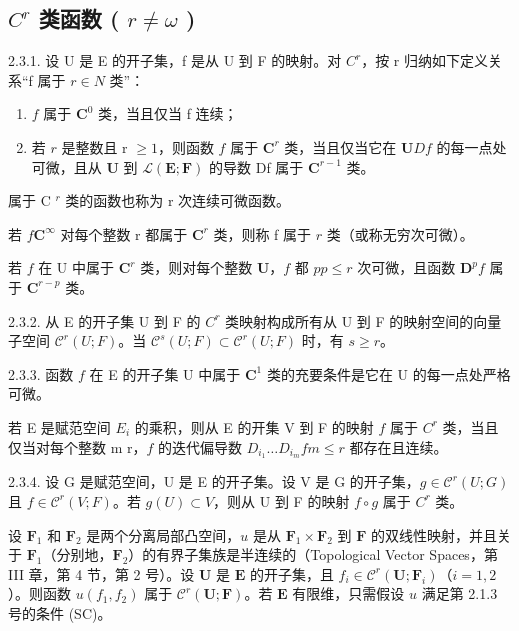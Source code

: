 \subsection{\texorpdfstring{\(C^{r}\) 类函数 ( \(r \neq \omega\) )}{C\^{}\{r\} 类函数 (r ≠ ω)}}

2.3.1. 设 U 是 E 的开子集，f 是从 U 到 F 的映射。对 \(C^{r}\)，按 r 归纳如下定义关系“f 属于 \(r \in N\) 类”：

\begin{enumerate}
\def\labelenumi{\arabic{enumi})}
\item
  \(f\) 属于 \(\mathbf{C}^{0}\) 类，当且仅当 f 连续；
\item
  若 \(r\) 是整数且 r \(\geqslant 1\)，则函数 \(f\) 属于 \(\mathbf{C}^{r}\) 类，当且仅当它在 \(\mathbf{U}\)\(Df\) 的每一点处可微，且从 \(\mathbf{U}\) 到 \(\mathcal{L}(\mathbf{E};\mathbf{F})\) 的导数 Df 属于 \(\mathbf{C}^{r-1}\) 类。
\end{enumerate}

属于 C \(^{r}\) 类的函数也称为 r 次连续可微函数。

若 \(f\)\(\mathbf{C}^{\infty}\) 对每个整数 r 都属于 \(\mathbf{C}^{r}\) 类，则称 f 属于 \(r\) 类（或称无穷次可微）。

若 \(f\) 在 U 中属于 \(\mathbf{C}^{r}\) 类，则对每个整数 \(\mathbf{U}\)，\(f\) 都 \(p\)\(p \leqslant r\) 次可微，且函数 \(\mathbf{D}^{p}f\) 属于 \(\mathbf{C}^{r-p}\) 类。

2.3.2. 从 E 的开子集 U 到 F 的 \(C^{r}\) 类映射构成所有从 U 到 F 的映射空间的向量子空间 \(\mathcal{C}^{r}(U;F)\)。当 \(\mathcal{C}^{s}(U;F)\subset\mathcal{C}^{r}(U;F)\) 时，有 \(s\geqslant r\)。

2.3.3. 函数 \(f\) 在 E 的开子集 U 中属于 \(\mathbf{C}^{1}\) 类的充要条件是它在 U 的每一点处严格可微。

若 E 是赋范空间 \(E_{i}\) 的乘积，则从 E 的开集 V 到 F 的映射 \(f\) 属于 \(C^{r}\) 类，当且仅当对每个整数 m  r，\(f\) 的迭代偏导数 \(D_{i_{1}}\ldots D_{i_{m}}f\)\(m \leqslant r\) 都存在且连续。

2.3.4. 设 G 是赋范空间，U 是 E 的开子集。设 V 是 G 的开子集，\(g \in \mathcal{C}^{r}(U; G)\) 且 \(f \in \mathcal{C}^{r}(V; F)\)。若 \(g(U) \subset V\)，则从 U 到 F 的映射 \(f \circ g\) 属于 \(C^{r}\) 类。

设 \(\mathbf{F}_1\) 和 \(\mathbf{F}_2\) 是两个分离局部凸空间，\(u\) 是从 \(\mathbf{F}_1 \times \mathbf{F}_2\) 到 \(\mathbf{F}\) 的双线性映射，并且关于 \(\mathbf{F}_1\)（分别地，\(\mathbf{F}_2\)）的有界子集族是半连续的（Topological Vector Spaces，第 III 章，第 4 节，第 2 号）。设 \(\mathbf{U}\) 是 \(\mathbf{E}\) 的开子集，且 \(f_i \in \mathcal{C}^r(\mathbf{U};\mathbf{F}_i)\)（\(i = 1,2\)）。则函数 \(u(f_1,f_2)\) 属于 \(\mathcal{C}^r(\mathbf{U};\mathbf{F})\)。若 \(\mathbf{E}\) 有限维，只需假设 \(u\) 满足第 2.1.3 号的条件 (SC)。

